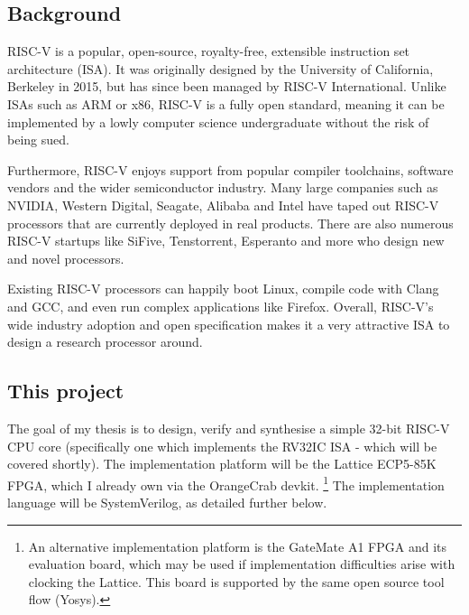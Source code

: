 \documentclass{article}
\begin{document}



\subsection{Background}
RISC-V is a popular, open-source, royalty-free, extensible instruction set architecture (ISA). It was
originally designed by the University of California, Berkeley in 2015, but has since been managed by RISC-V
International. Unlike ISAs such as ARM or x86, RISC-V is a fully open standard, meaning it can be implemented
by a lowly computer science undergraduate without the risk of being sued.

Furthermore, RISC-V enjoys support from popular compiler toolchains, software vendors and the wider
semiconductor industry. Many large companies such as NVIDIA, Western Digital, Seagate, Alibaba and Intel have
taped out RISC-V processors that are currently deployed in real products. There are also numerous RISC-V startups
like SiFive, Tenstorrent, Esperanto and more who design new and novel processors.

Existing RISC-V processors can happily boot Linux, compile code with Clang and GCC, and even run complex
applications like Firefox. Overall, RISC-V's wide industry adoption and open specification makes it a very
attractive ISA to design a research processor around.

\subsection{This project}
The goal of my thesis is to design, verify and synthesise a simple 32-bit RISC-V CPU core (specifically one
which implements the RV32IC ISA - which will be covered shortly). The implementation platform will be the
Lattice ECP5-85K FPGA, which I already own via the OrangeCrab devkit. 
\footnote{An alternative implementation platform is the GateMate A1 FPGA and its evaluation board, which may be used
if implementation difficulties arise with clocking the Lattice. This board is supported by the
same open source tool flow (Yosys).}
The implementation language will be
SystemVerilog, as detailed further below.
\end{document}
